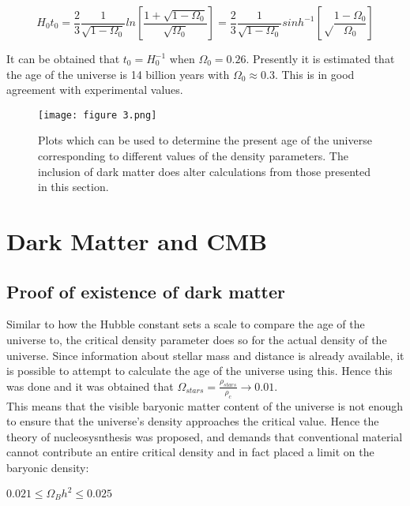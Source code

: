 \documentclass{article}
\begin{document}
\begin{equation}
    H_0t_0 = \frac{2}{3}\frac{1}{\sqrt{1-\Omega_0}}ln[\frac{1+\sqrt{1-\Omega_0}}{\sqrt{\Omega_0}}] = \frac{2}{3}\frac{1}{\sqrt{1-\Omega_0}}sinh^{-1}[\sqrt\frac{1-\Omega_0}{\Omega_0}]
\end{equation}

It can be obtained that $t_0 = H_0^{-1}$ when $\Omega_0 = 0.26$. Presently it is estimated that the age of the universe is 14 billion years with $\Omega_0 \approx 0.3$. This is in good agreement with experimental values.

\begin{figure}[H]
    \centering
    \texttt{[image: figure 3.png]}
    \caption{Plots which can be used to determine the present age of the universe corresponding to different values of the density parameters. The inclusion of dark matter does alter calculations from those presented in this section.}
    \label{fig:age}
\end{figure}

\section{Dark Matter and CMB}
\subsection{Proof of existence of dark matter}

Similar to how the Hubble constant sets a scale to compare the age of the universe to, the critical density parameter does so for the actual density of the universe. Since information about stellar mass and distance is already available, it is possible to attempt to calculate the age of the universe using this. Hence this was done and it was obtained that $\Omega_{stars} = \frac{\rho_{stars}}{\rho_c}\rightarrow 0.01$.
\\
This means that the visible baryonic matter content of the universe is not enough to ensure that the universe's density approaches the critical value. Hence the theory of nucleosysnthesis was proposed, and demands that conventional material cannot contribute an entire critical density and in fact placed a limit on the baryonic density:

\begin{center}
    $0.021 \leq {\Omega_B}h^2 \leq 0.025$
\end{center}
\end{document}
